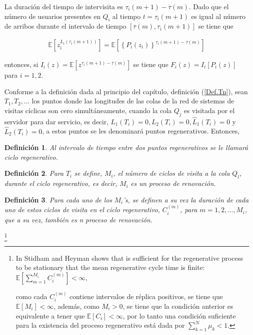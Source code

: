 \documentclass{article}
\newtheorem{Def}{Definición}
\newcommand{\esp}{\mathbb{E}}
\begin{document}
La duraci\'on del tiempo de intervisita es $\tau_{i}\left(m+1\right)-\overline{\tau}\left(m\right)$. Dado que el n\'umero de usuarios presentes en $Q_{i}$ al tiempo $t=\tau_{i}\left(m+1\right)$ es igual al n\'umero de arribos durante el intervalo de tiempo $\left[\overline{\tau}\left(m\right),\tau_{i}\left(m+1\right)\right]$ se tiene que


\begin{eqnarray*}
\esp\left[z_{i}^{L_{i}\left(\tau_{i}\left(m+1\right)\right)}\right]=\esp\left[\left\{P_{i}\left(z_{i}\right)\right\}^{\tau_{i}\left(m+1\right)-\overline{\tau}\left(m\right)}\right]
\end{eqnarray*}

entonces, si $I_{i}\left(z\right)=\esp\left[z^{\tau_{i}\left(m+1\right)-\overline{\tau}\left(m\right)}\right]$
se tiene que $F_{i}\left(z\right)=I_{i}\left[P_{i}\left(z\right)\right]$
para $i=1,2$.

Conforme a la definici\'on dada al principio del cap\'itulo, definici\'on (\ref{Def.Tn}), sean $T_{1},T_{2},\ldots$ los puntos donde las longitudes de las colas de la red de sistemas de visitas c\'iclicas son cero simult\'aneamente, cuando la cola $Q_{j}$ es visitada por el servidor para dar servicio, es decir, $L_{1}\left(T_{i}\right)=0,L_{2}\left(T_{i}\right)=0,\hat{L}_{1}\left(T_{i}\right)=0$ y $\hat{L}_{2}\left(T_{i}\right)=0$, a estos puntos se les denominar\'a puntos regenerativos. Entonces, 

\begin{Def}
Al intervalo de tiempo entre dos puntos regenerativos se le llamar\'a ciclo regenerativo.
\end{Def}

\begin{Def}
Para $T_{i}$ se define, $M_{i}$, el n\'umero de ciclos de visita a la cola $Q_{l}$, durante el ciclo regenerativo, es decir, $M_{i}$ es un proceso de renovaci\'on.
\end{Def}

\begin{Def}
Para cada uno de los $M_{i}$'s, se definen a su vez la duraci\'on de cada uno de estos ciclos de visita en el ciclo regenerativo, $C_{i}^{(m)}$, para $m=1,2,\ldots,M_{i}$, que a su vez, tambi\'en es n proceso de renovaci\'on.
\end{Def}

\footnote{In Stidham and  Heyman \cite{Stidham} shows that is sufficient for the regenerative process to be stationary that the mean regenerative cycle time is finite: $\esp\left[\sum_{m=1}^{M_{i}}C_{i}^{(m)}\right]<\infty$, 


 como cada $C_{i}^{(m)}$ contiene intervalos de r\'eplica positivos, se tiene que $\esp\left[M_{i}\right]<\infty$, adem\'as, como $M_{i}>0$, se tiene que la condici\'on anterior es equivalente a tener que $\esp\left[C_{i}\right]<\infty$,
por lo tanto una condici\'on suficiente para la existencia del proceso regenerativo est\'a dada por $\sum_{k=1}^{N}\mu_{k}<1.$}
\end{document}
